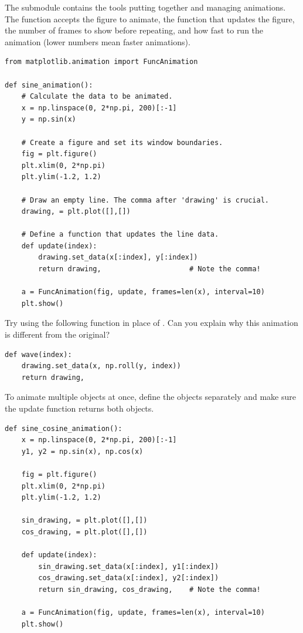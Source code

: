 The submodule  contains the tools putting together and managing animations.
The function  accepts the figure to animate, the function that updates the figure, the number of frames to show before repeating, and how fast to run the animation (lower numbers mean faster animations).

\begin{lstlisting}
from matplotlib.animation import FuncAnimation

def sine_animation():
    # Calculate the data to be animated.
    x = np.linspace(0, 2*np.pi, 200)[:-1]
    y = np.sin(x)

    # Create a figure and set its window boundaries.
    fig = plt.figure()
    plt.xlim(0, 2*np.pi)
    plt.ylim(-1.2, 1.2)

    # Draw an empty line. The comma after 'drawing' is crucial.
    drawing, = plt.plot([],[])

    # Define a function that updates the line data.
    def update(index):
        drawing.set_data(x[:index], y[:index])
        return drawing,                     # Note the comma!

    a = FuncAnimation(fig, update, frames=len(x), interval=10)
    plt.show()
\end{lstlisting}

Try using the following function in place of .
Can you explain why this animation is different from the original?

\begin{lstlisting}
def wave(index):
    drawing.set_data(x, np.roll(y, index))
    return drawing,
\end{lstlisting}

To animate multiple objects at once, define the objects separately and make sure the update function returns both objects.

\begin{lstlisting}
def sine_cosine_animation():
    x = np.linspace(0, 2*np.pi, 200)[:-1]
    y1, y2 = np.sin(x), np.cos(x)

    fig = plt.figure()
    plt.xlim(0, 2*np.pi)
    plt.ylim(-1.2, 1.2)

    sin_drawing, = plt.plot([],[])
    cos_drawing, = plt.plot([],[])

    def update(index):
        sin_drawing.set_data(x[:index], y1[:index])
        cos_drawing.set_data(x[:index], y2[:index])
        return sin_drawing, cos_drawing,    # Note the comma!

    a = FuncAnimation(fig, update, frames=len(x), interval=10)
    plt.show()
\end{lstlisting}

